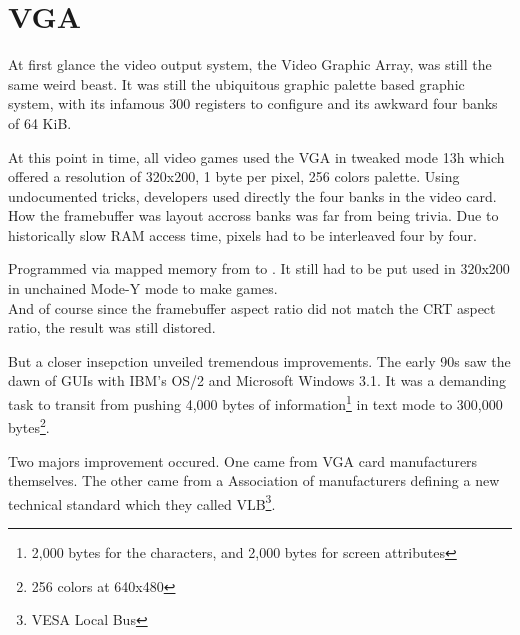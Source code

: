 \section{VGA}
At first glance the video output system, the Video Graphic Array, was still the same weird beast. It was still the ubiquitous graphic palette based graphic system, with its infamous 300 registers to configure and its awkward four banks of 64 KiB.\\
\par
At this point in time, all video games used the VGA in tweaked mode 13h which offered a resolution of 320x200, 1 byte per pixel, 256 colors palette. Using undocumented tricks, developers used directly the four banks in the video card. How the framebuffer was layout accross banks was far from being trivia. Due to historically slow RAM access time, pixels had to be interleaved four by four.\\
\par
\par
{}
\par
Programmed via mapped memory from  to . It still had to be put used in 320x200 in unchained Mode-Y mode to make games.\\

And of course since the framebuffer aspect ratio did not match the CRT aspect ratio, the result was still distored.
\par
{}
\par
But a closer insepction unveiled tremendous improvements. The early 90s saw the dawn of GUIs with IBM's OS/2 and Microsoft Windows 3.1. It was a demanding task to transit from pushing 4,000 bytes of information\footnote{2,000 bytes for the characters, and 2,000 bytes for screen attributes} in text mode to 300,000 bytes\footnote{256 colors at 640x480}.\\
\par

Two majors improvement occured. One came from VGA card manufacturers themselves. The other came from a Association of manufacturers defining a new technical standard which they called VLB\footnote{VESA Local Bus}.\\ 
\par
{}
\par
{}
\par


